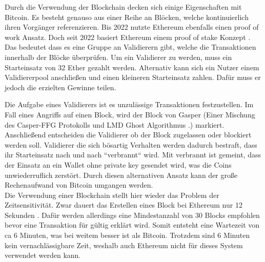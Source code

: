 \documentclass[11pt,a4paper]{scrreprt}
\begin{document}
Durch die Verwendung der Blockchain decken sich einige Eigenschaften mit Bitcoin. Es besteht genauso aus einer Reihe an Blöcken, welche kontinuierlich ihren Vorgänger referenzieren. Bis 2022 nutzte Ethereum ebenfalls einen proof of work Ansatz. Doch seit 2022 basiert Ethereum einem proof of stake Konzept \cite{eth-explainerInvestopia}. Das bedeutet dass es eine Gruppe an Validierern gibt, welche die Transaktionen innerhalb der Blöcke überprüfen. Um ein Validierer zu werden, muss ein Starteinsatz von 32 Ether gezahlt werden. Alternativ kann sich ein Nutzer einem Validiererpool anschließen und einen kleineren Starteinsatz zahlen. Dafür muss er jedoch die erzielten Gewinne teilen. 

Die Aufgabe eines Validierers ist es unzulässige Transaktionen festzustellen. Im Fall eines Angriffs auf einen Block, wird der Block von Gasper (Einer Mischung des Casper-FFG Protokolls und LMD Ghost Algorithmus \cite{eth-buterin2020combining}.) markiert. Anschließend entscheiden die Validierer ob der Block zugelassen oder blockiert werden soll.  Validierer die sich bösartig Verhalten werden dadurch bestraft, dass ihr Starteinsatz nach und nach ``verbrannt`` wird. Mit verbrannt ist gemeint, dass der Einsatz an ein Wallet ohne private key gesendet wird, was die Coins unwiederruflich zerstört. Durch diesen alternativen Ansatz kann der große Rechenaufwand von Bitcoin umgangen werden.\\

Die Verwendung einer Blockchain stellt hier wieder das Problem der Zeitsensitivität. Zwar dauert das Erstellen eines Block bei Ethereum nur 12 Sekunden \cite{eth-timePerBlock}. Dafür werden allerdings eine Mindestanzahl von 30 Blocks empfohlen bevor eine Transaktion für gültig erklärt wird. Somit entsteht eine Wartezeit von ca 6 Minuten, was bei weitem besser ist als Bitcoin. Trotzdem sind 6 Minuten kein vernachlässigbare Zeit, weshalb auch Ethereum nicht für dieses System verwendet werden kann.
\end{document}
